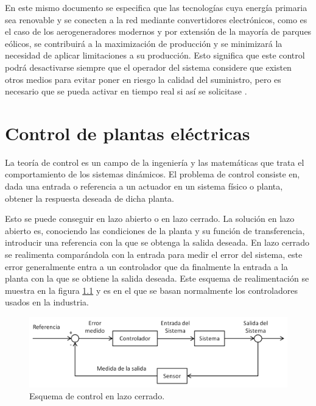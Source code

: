 \documentclass{book}
\begin{document}
En este mismo documento se especifica que las tecnolog\'ias cuya energ\'ia primaria sea renovable y se conecten a la red mediante convertidores electr\'onicos, como es el caso de los aerogeneradores modernos y por extensi\'on de la mayor\'ia de parques e\'olicos, se contribuir\'a a la maximizaci\'on de producci\'on y se minimizar\'a la necesidad de aplicar limitaciones a su producci\'on. Esto significa que este control podr\'a desactivarse siempre que el operador del sistema considere que existen otros medios para evitar poner en riesgo la calidad del suministro, pero es necesario que se pueda activar en tiempo real si as\'i se solicitase \cite{PO12}. \par

\chapter{Control de plantas el\'ectricas}

La teor\'ia de control es un campo de la ingenier\'ia y las matem\'aticas que trata el comportamiento de los sistemas din\'amicos. El problema de control consiste en, dada una entrada o referencia a un actuador en un sistema f\'isico o planta, obtener la respuesta deseada de dicha planta. \par

Esto se puede conseguir en lazo abierto o en lazo cerrado. La solución en lazo abierto es, conociendo las condiciones de la planta y su funci\'on de transferencia, introducir una referencia con la que se obtenga la salida deseada. En lazo cerrado se realimenta compar\'andola con la entrada para medir el error del sistema, este error generalmente entra a un controlador que da finalmente la entrada a la planta con la que se obtiene la salida deseada. Este esquema de realimentaci\'on se muestra en la figura \ref{FeedBackLoop} y es en el que se basan normalmente los controladores usados en la industria. \par

\begin{figure}[h!]
\centering
\includegraphics[width=1\textwidth]{Realimentacion.PNG}
\caption{Esquema de control en lazo cerrado.}
\label{FeedBackLoop}
\end{figure}
\end{document}
